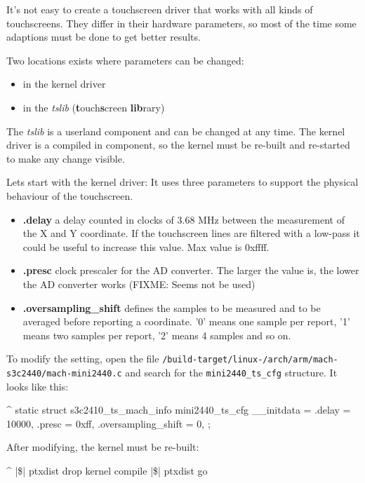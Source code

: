 It's not easy to create a touchscreen driver that works with all kinds of
touchscreens. They differ in their hardware parameters, so most of the time
some adaptions must be done to get better results.

Two locations exists where parameters can be changed:

\begin{itemize}
	\item in the kernel driver
	\item in the \textit{tslib} (\textbf{t}ouch\textbf{s}creen \textbf{lib}rary)
\end{itemize}

The \textit{tslib} is a userland component and can be changed at any time.
The kernel driver is a compiled in component, so the kernel must be re-built
and re-started to make any change visible.

Lets start with the kernel driver: It uses three parameters to support the
physical behaviour of the touchscreen.

\begin{itemize}
	\item \textbf{.delay} a delay counted in clocks of 3.68 MHz between
		the measurement of the X and Y coordinate. If the touchscreen
		lines are filtered with a low-pass it could be useful to
		increase this value. Max value is 0xffff.
	\item \textbf{.presc} clock prescaler for the AD converter. The larger the
		value is, the lower the AD converter works (FIXME: Seems not be
		used)
	\item \textbf{.oversampling\_shift} defines the samples to be measured and
		to be averaged before reporting a coordinate. '0' means one sample per
		report, '1' means two samples per report, '2' means 4 samples and
		so on.
\end{itemize}

To modify the setting, open the file
\texttt{\ptxdistPlatformDir /build-target/linux-\curKernelRev /arch/arm/mach-s3c2440/mach-mini2440.c}
and search for the \texttt{mini2440\_ts\_cfg} structure. It looks like this:

\begin{ptxshell}[escapechar=|]{^}
static struct s3c2410_ts_mach_info mini2440_ts_cfg __initdata = {
	.delay = 10000,
	.presc = 0xff,
	.oversampling_shift = 0,
};
\end{ptxshell}

After modifying, the kernel must be re-built:

\begin{ptxshell}[escapechar=|]{^}
|\$| ptxdist drop kernel compile
|\$| ptxdist go
\end{ptxshell}

